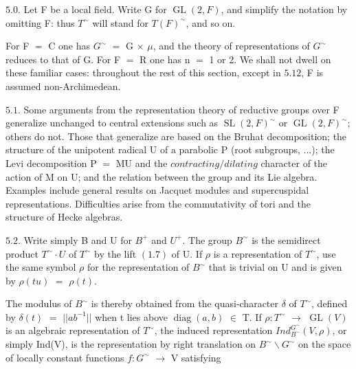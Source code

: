 \documentclass[10pt,a4paper]{article}
\begin{document}
\clearpage
{}
\label{d035-physical-021}
\par\medskip{}\par\smallskip
\par $5.0$. Let F be a local field. Write G for $\operatorname{GL}(2,F)$, and simplify the notation by omitting F: thus $T^\sim$ will stand for $T(F)^\sim$, and so on.\par
\par For F $=$ C one has $G^\sim$ $=$ G $\times{}$ $\mu{}$, and the theory of representations of $G^\sim$ reduces to that of G. For F $=$ R one has n $=$ 1 or 2. We shall not dwell on these familiar cases: throughout the rest of this section, except in $5.12$, F is assumed non-Archimedean.\par
\par $5.1$. Some arguments from the representation theory of reductive groups over F generalize unchanged to central extensions such as $\operatorname{SL}(2,F)^\sim$ or $\operatorname{GL}(2,F)^\sim$; others do not. Those that generalize are based on the Bruhat decomposition; the structure of the unipotent radical U of a parabolic P (root subgroups, ...); the Levi decomposition P $=$ MU and the $contracting/dilating$ character of the action of M on U; and the relation between the group and its Lie algebra. Examples include general results on Jacquet modules and supercuspidal representations. Difficulties arise from the commutativity of tori and the structure of Hecke algebras.\par
\par $5.2$. Write simply B and U for $B^+$ and $U^+$. The group $B^\sim$ is the semidirect product $T^\sim\cdot{}U$ of $T^\sim$ by the lift $(1.7)$ of U. If $\rho{}$ is a representation of $T^\sim$, use the same symbol $\rho{}$ for the representation of $B^\sim$ that is trivial on U and is given by $\rho{}(tu)$ $=$ $\rho{}(t)$.\par
\par The modulus of $B^\sim$ is thereby obtained from the quasi-character $\delta{}$ of $T^\sim$, defined by $\delta{}(t)$ $=$ $||ab^{-1}||$ when t lies above $\operatorname{diag}(a,b)$ $\in{}$ T. If $\rho{}:T^\sim$ $\to{}$ $\operatorname{GL}(V)$ is an algebraic representation of $T^\sim$, the induced representation $Ind_{B^\sim}^{G^\sim}(V,\rho{})$, or simply Ind(V), is the representation by right translation on $B^\sim\backslash G^\sim$ on the space of locally constant functions $f:G^\sim$ $\to{}$ V satisfying\par
\end{document}
